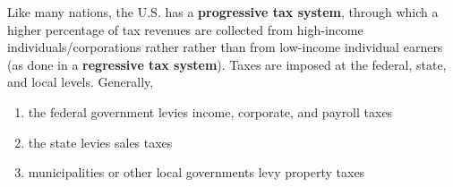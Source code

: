 \documentclass{article}
\begin{document}
    \begin{definition}
      Like many nations, the U.S. has a \textbf{progressive tax system}, through which a higher percentage of tax revenues are collected from high-income individuals/corporations rather rather than from low-income individual earners (as done in a \textbf{regressive tax system}). Taxes are imposed at the federal, state, and local levels. Generally, 
      \begin{enumerate}
        \item the federal government levies income, corporate, and payroll taxes
        \item the state levies sales taxes
        \item municipalities or other local governments levy property taxes
      \end{enumerate}
    \end{definition}
\end{document}
